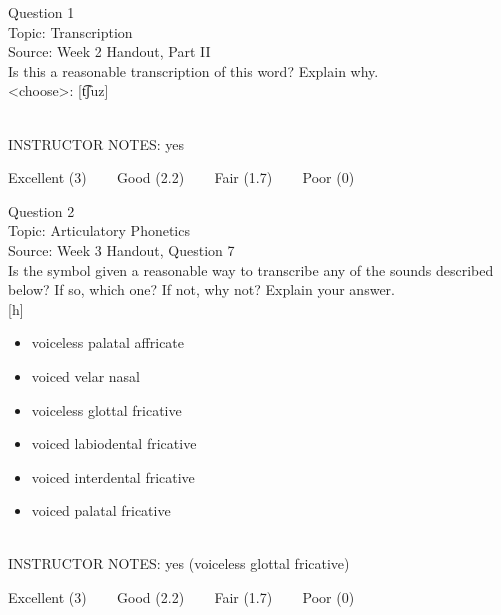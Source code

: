 \documentclass[12pt]{article}
\begin{document}
\begin{center}
\textbf{{\color{blue}{\HUGE START OF EXAM\\}}}

\textbf{{\color{blue}{\HUGE Student ID: 89930\\}}}

\textbf{{\color{blue}{\HUGE \\}}}

\end{center}
\newpage

{\large Question 1}\\

Topic: Transcription\\
Source: Week 2 Handout, Part II\\

Is this a reasonable transcription of this word? Explain why.\\

<choose>: {[t͡ʃuz]}


~\\
INSTRUCTOR NOTES: yes


\vfill
Excellent (3) ~~~ Good (2.2) ~~~ Fair (1.7) ~~~ Poor (0)
\newpage

{\large Question 2}\\

Topic: Articulatory Phonetics\\
Source: Week 3 Handout, Question 7\\

Is the symbol given a reasonable way to transcribe any of the sounds described below? If so, which one? If not, why not? Explain your answer.\\

{[h]}

\begin{itemize} \item voiceless palatal affricate \item voiced velar nasal \item voiceless glottal fricative \item voiced labiodental fricative \item voiced interdental fricative \item voiced palatal fricative \end{itemize}


~\\
INSTRUCTOR NOTES: yes (voiceless glottal fricative)


\vfill
Excellent (3) ~~~ Good (2.2) ~~~ Fair (1.7) ~~~ Poor (0)
\newpage
\end{document}

